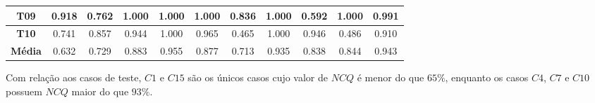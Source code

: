 \begin{table}[htbp]
\begin{tabular}{|c|cccccccccc|}
		\textbf{T09}                                             & \multicolumn{1}{c|}{0.918}                               & \multicolumn{1}{c|}{0.762}                               & \multicolumn{1}{c|}{1.000}                               & \multicolumn{1}{c|}{1.000}                               & \multicolumn{1}{c|}{1.000}                               & \multicolumn{1}{c|}{0.836}                               & \multicolumn{1}{c|}{1.000}                               & \multicolumn{1}{c|}{0.592}                               & \multicolumn{1}{c|}{1.000}                               & 0.991                        \\ \hline
		\rowcolor[HTML]{F2F2F2} 
		\textbf{T10}                                             & \multicolumn{1}{c|}{\cellcolor[HTML]{F2F2F2}0.741}       & \multicolumn{1}{c|}{\cellcolor[HTML]{F2F2F2}0.857}       & \multicolumn{1}{c|}{\cellcolor[HTML]{F2F2F2}0.944}       & \multicolumn{1}{c|}{\cellcolor[HTML]{F2F2F2}1.000}       & \multicolumn{1}{c|}{\cellcolor[HTML]{F2F2F2}0.965}       & \multicolumn{1}{c|}{\cellcolor[HTML]{F2F2F2}0.465}       & \multicolumn{1}{c|}{\cellcolor[HTML]{F2F2F2}1.000}       & \multicolumn{1}{c|}{\cellcolor[HTML]{F2F2F2}0.946}       & \multicolumn{1}{c|}{\cellcolor[HTML]{F2F2F2}0.486}       & 0.910                        \\ \hline
		{\color[HTML]{000000} \textbf{Média}}                    & \multicolumn{1}{c|}{{\color[HTML]{000000} 0.632}}        & \multicolumn{1}{c|}{{\color[HTML]{000000} 0.729}}        & \multicolumn{1}{c|}{{\color[HTML]{000000} 0.883}}        & \multicolumn{1}{c|}{{\color[HTML]{000000} 0.955}}        & \multicolumn{1}{c|}{{\color[HTML]{000000} 0.877}}        & \multicolumn{1}{c|}{{\color[HTML]{000000} 0.713}}        & \multicolumn{1}{c|}{{\color[HTML]{000000} 0.935}}        & \multicolumn{1}{c|}{{\color[HTML]{000000} 0.838}}        & \multicolumn{1}{c|}{{\color[HTML]{000000} 0.844}}        & {\color[HTML]{000000} 0.943} \\ \hline
	\end{tabular}
	\label{tab:F3_A2_NCQ_CASOS}
\end{table}

Com relação aos casos de teste, $C1$ e $C15$ são os únicos casos cujo valor de $NCQ$ é menor do que $65\%$, enquanto os casos $C4$, $C7$ e $C10$ possuem $NCQ$ maior do que $93\%$.

